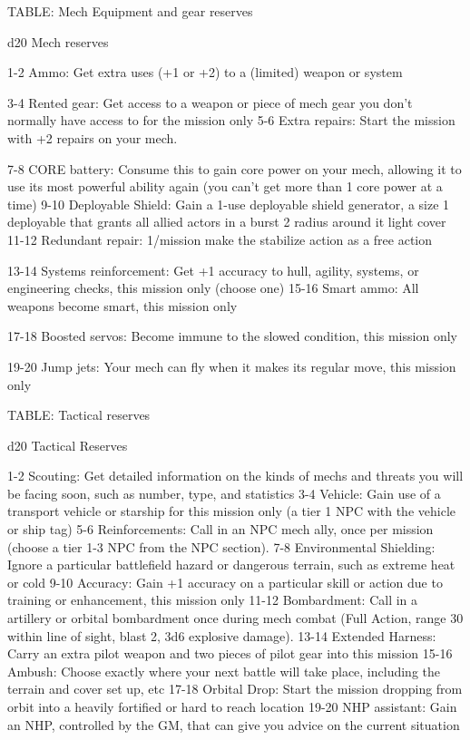TABLE: Mech Equipment and gear reserves  

 d20       Mech	reserves 

  1-2      Ammo: Get extra uses (+1 or +2) to a (limited) weapon or system 

  3-4      Rented gear: Get access to a weapon or piece of mech gear you don’t normally have  
           access to for the mission only 
  5-6      Extra repairs: Start the mission with +2 repairs on your mech. 

  7-8      CORE battery: Consume this to gain core power on your mech, allowing it to use its  
           most powerful ability again (you can’t get more than 1 core power at a time) 
 9-10      Deployable Shield: Gain a 1-use deployable shield generator, a size 1 deployable that  
           grants all allied actors in a burst 2 radius around it light cover 
   11-12   Redundant repair: 1/mission make the stabilize action as a free action 

   13-14   Systems reinforcement: Get +1 accuracy to hull, agility, systems, or engineering  
           checks, this mission only (choose one) 
   15-16   Smart ammo: All weapons become smart, this mission only 

   17-18   Boosted servos: Become immune to the slowed condition, this mission only 

   19-20   Jump jets: Your mech can fly when it makes its regular move, this mission only 

TABLE: Tactical reserves  

                                                                                                                


 d20       Tactical	Reserves 

 1-2       Scouting: Get detailed information on the kinds of mechs and threats you will be  
           facing soon, such as number, type, and statistics 
 3-4       Vehicle: Gain use of a transport vehicle or starship for this mission only (a tier 1 NPC  
           with the vehicle or ship tag) 
 5-6       Reinforcements: Call in an NPC mech ally, once per mission (choose a tier 1-3 NPC  
           from the NPC section). 
 7-8       Environmental Shielding: Ignore a particular battlefield hazard or dangerous terrain,  
           such as extreme heat or cold 
 9-10      Accuracy: Gain +1 accuracy on a particular skill or action due to training or  
           enhancement, this mission only 
 11-12     Bombardment: Call in a artillery or orbital bombardment once during mech combat  
           (Full Action, range 30 within line of sight, blast 2, 3d6 explosive damage). 
 13-14     Extended Harness: Carry an extra pilot weapon and two pieces of pilot gear into this  
           mission 
 15-16     Ambush: Choose exactly where your next battle will take place, including the terrain  
           and cover set up, etc 
 17-18     Orbital Drop: Start the mission dropping from orbit into a heavily fortified or hard to  
           reach location 
 19-20     NHP assistant: Gain an NHP, controlled by the GM, that can give you advice on the  
           current situation 

